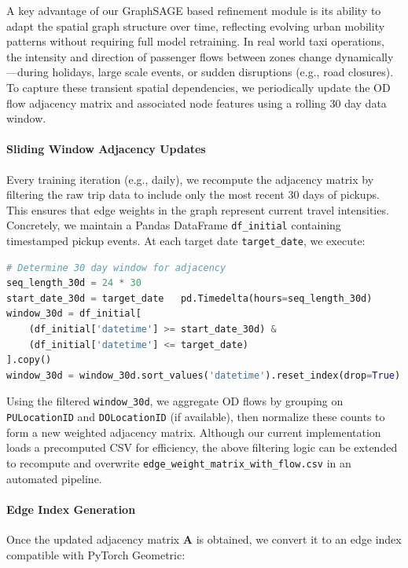 \documentclass{article}
\begin{document}
A key advantage of our GraphSAGE based refinement module is its ability to adapt the spatial graph structure over time, reflecting evolving urban mobility patterns without requiring full model retraining. In real world taxi operations, the intensity and direction of passenger flows between zones change dynamically—during holidays, large scale events, or sudden disruptions (e.g., road closures). To capture these transient spatial dependencies, we periodically update the OD flow adjacency matrix and associated node features using a rolling 30 day data window.

\paragraph{Sliding Window Adjacency Updates}  
Every training iteration (e.g., daily), we recompute the adjacency matrix by filtering the raw trip data to include only the most recent 30 days of pickups. This ensures that edge weights in the graph represent current travel intensities. Concretely, we maintain a Pandas DataFrame \texttt{df\_initial} containing timestamped pickup events. At each target date \texttt{target\_date}, we execute:

\begin{lstlisting}[language=Python, caption={Filtering 30 Day Window for Adjacency Update}]
# Determine 30 day window for adjacency
seq_length_30d = 24 * 30
start_date_30d = target_date   pd.Timedelta(hours=seq_length_30d)
window_30d = df_initial[
    (df_initial['datetime'] >= start_date_30d) &
    (df_initial['datetime'] <= target_date)
].copy()
window_30d = window_30d.sort_values('datetime').reset_index(drop=True)
\end{lstlisting}

Using the filtered \texttt{window\_30d}, we aggregate OD flows by grouping on \texttt{PULocationID} and \texttt{DOLocationID} (if available), then normalize these counts to form a new weighted adjacency matrix. Although our current implementation loads a precomputed CSV for efficiency, the above filtering logic can be extended to recompute and overwrite \texttt{edge\_weight\_matrix\_with\_flow.csv} in an automated pipeline.

\paragraph{Edge Index Generation}  
Once the updated adjacency matrix \(\mathbf{A}\) is obtained, we convert it to an edge index compatible with PyTorch Geometric:
\end{document}
